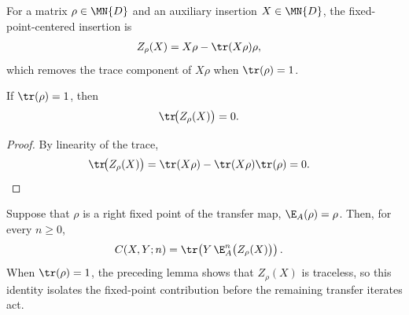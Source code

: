 \begin{definition}%
    \label{def:correlator_traceless_part}
    \leanok
    For a matrix $\rho\in\MN{D}$ and an auxiliary insertion
    $X\in\MN{D}$, the fixed-point-centered insertion is
    \begin{align}
        Z_\rho(X)
         & = X\rho-\tr(X\rho)\rho,
        \label{eq:correlator_traceless_part}
    \end{align}
    which removes the trace component of $X\rho$ when $\tr(\rho)=1$.
\end{definition}

\begin{lemma}%
    \label{lem:trace_correlator_traceless_part}
    \leanok
    If $\tr(\rho)=1$, then
    \begin{align}
        \tr\!\bigl(Z_\rho(X)\bigr) & =0.
    \end{align}
\end{lemma}

\begin{proof}
    \leanok
    By linearity of the trace,
    \begin{align}
        \tr\!\bigl(Z_\rho(X)\bigr)
         & =\tr(X\rho)-\tr(X\rho)\tr(\rho)
        =0.
    \end{align}
\end{proof}

\begin{lemma}%
    \label{thm:connected_correlator_traceless_reduction}
    \leanok
    Suppose that $\rho$ is a right fixed point of the transfer map,
    $\E_A(\rho)=\rho$.  Then, for every $n\geq0$,
    \begin{align}
        C(X,Y;n)
         & =\tr\!\left(Y\,\E_A^n\bigl(Z_\rho(X)\bigr)\right).
        \label{eq:connected_correlator_traceless_reduction}
    \end{align}
    When $\tr(\rho)=1$, the preceding lemma shows that $Z_\rho(X)$ is
    traceless, so this identity isolates the fixed-point contribution before
    the remaining transfer iterates act.
\end{lemma}

